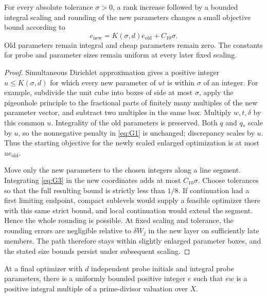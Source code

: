 \begin{proposition}\label{c:integral-rounding}
For every absolute tolerance \(\sigma>0\), a rank
increase followed by a bounded integral scaling and
rounding of the new parameters changes a small objective
bound according to
\begin{equation}\label{eq:G4}
 e_{\mathrm{new}}=K(\sigma,d)e_{\mathrm{old}}
                                    +C_{10}\sigma.
\end{equation}
Old parameters remain integral and cheap parameters
remain zero.  The constants for probe and parameter
sizes remain uniform at every later fixed scaling.
\end{proposition}

\begin{proof}
Simultaneous Dirichlet approximation gives a positive
integer \(u\le K(\sigma,d)\) for which every new
parameter of \(ut\) is within \(\sigma\) of an integer.
For example, subdivide the unit cube into boxes of
side at most \(\sigma\), apply the pigeonhole principle
to the fractional parts of finitely many multiples
of the new parameter vector, and subtract two multiples
in the same box.  Multiply \(w,t,\delta\) by this
common \(u\).  Integrality of the old parameters is
preserved.  Both \(q\) and \(q_*\) scale by \(u\),
so the nonnegative penalty in \eqref{eq:G1} is unchanged;
discrepancy scales by \(u\).  Thus the starting objective
for the newly scaled enlarged optimization is at most
\(u e_{\mathrm{old}}\).

Move only the new parameters to the chosen integers
along a line segment.  Integrating \eqref{eq:G3} in
the new coordinates adds at most \(C_{10}\sigma\).
Choose tolerances so that the full resulting bound
is strictly less than \(1/8\).  If continuation had
a first limiting endpoint, compact sublevels would
supply a feasible optimizer there with this same
strict bound, and local continuation would extend
the segment.  Hence the whole rounding is possible.
At fixed scaling and tolerance, the rounding errors
are negligible relative to \(\delta W_j\) in the
new layer on sufficiently late members.  The path
therefore stays within slightly enlarged parameter
boxes, and the stated size bounds persist under
subsequent scaling.
\end{proof}

\begin{proposition}\label{c:divisorial-index}
At a final optimizer with \(d\) independent probe
initials and integral probe parameters, there is a
uniformly bounded positive integer \(e\) such that
\(ew\) is a positive integral multiple of a
prime-divisor valuation over \(X\).
\end{proposition}

